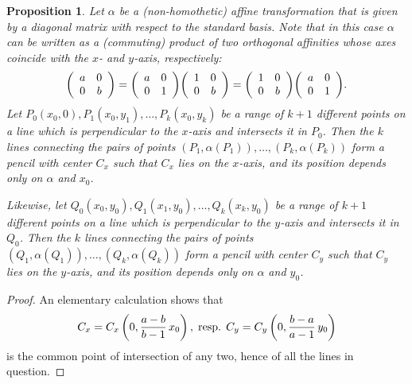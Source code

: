 \documentclass[reqno,12pt]{amsart}
\theoremstyle{plain}
\newtheorem{prop}[theorem]{Proposition}
\theoremstyle{definition}
\theoremstyle{remark}
\newenvironment{matr}[1]{\left( \begin{array}{#1}}{\end{array}\right)}
\begin{document}
\begin{prop}\label{prop:pencil}
Let $\alpha$ be a (non-homothetic) affine transformation that is given by a diagonal matrix with respect to the standard basis.
Note that in this case $\alpha$ can be written as a (commuting) product of two orthogonal affinities whose axes coincide with the 
$x$- and $y$-axis, respectively:
%
$$
\begin{matr}{cc}
a&0\\0&b
\end{matr}
=
\begin{matr}{cc}
a&0\\0&1
\end{matr}
%
\begin{matr}{cc}
1&0\\0&b
\end{matr}
=
\begin{matr}{cc}
1&0\\0&b
\end{matr}%
\begin{matr}{cc}
a&0\\0&1
\end{matr}.
$$
%
Let $P_0(x_0,0),P_1(x_0, y_1),\dots,P_k(x_0, y_k)$ be a range of $k+1$ different points on a line which 
is perpendicular to the $x$-axis and intersects it in $P_0$. Then the $k$ lines connecting the pairs of points 
$(P_1, \alpha(P_1)),\dots, (P_k, \alpha(P_k))$ form a pencil with center $C_x$ such that $C_x$ lies on the 
$x$-axis, and its position depends only on $\alpha$ and $x_0$.

Likewise, let $Q_0(x_0,y_0),Q_1(x_1, y_0),\dots,Q_k(x_k, y_0)$ be a range of $k+1$ different points on a 
line which is perpendicular to the $y$-axis and intersects it in $Q_0$. Then the $k$ lines connecting the pairs 
of points $(Q_1, \alpha(Q_1)),\dots, (Q_k, \alpha(Q_k))$ form a pencil with center $C_y$ such that $C_y$ 
lies on the $y$-axis, and its position depends only on $\alpha$ and $y_0$.
%
\end{prop}
%
\begin{proof} An elementary calculation shows that 
$$
C_x=C_x\left(0,\displaystyle\frac{a-b}{b-1}\,x_0\right),
\text{\;resp.\;\,}
C_y=C_y\left(0,\displaystyle\frac{b-a}{a-1}\,y_0\right)
$$
is the common point of intersection of any two, hence of all the lines in question.
%
\end{proof}
\medskip
\end{document}
